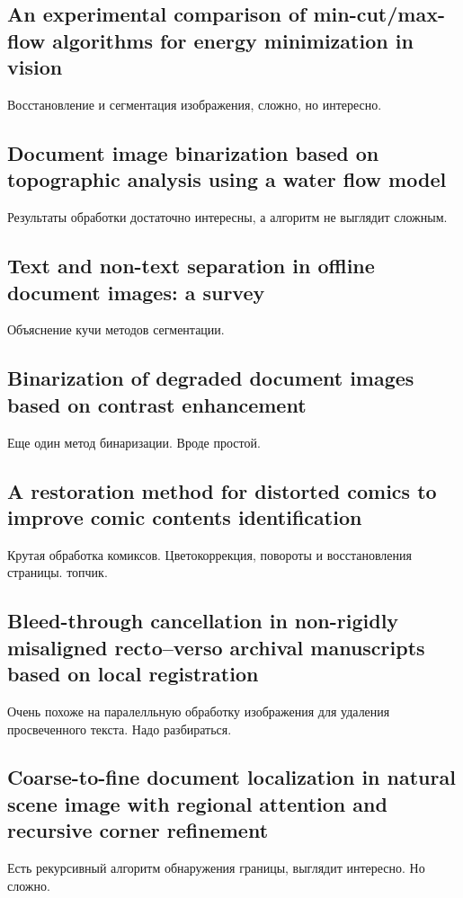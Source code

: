 \documentclass[12pt]{article}
\begin{document}
\subsection{An experimental comparison of min-cut/max- flow algorithms for energy minimization in vision}
Восстановление и сегментация изображения, сложно, но интересно.


\subsection{Document image binarization based on topographic analysis using a water flow model}
Результаты обработки достаточно интересны, а алгоритм не выглядит сложным. 


\subsection{Text and non-text separation in offline document images: a survey}
Объяснение кучи методов сегментации.


\subsection{Binarization of degraded document images based on contrast enhancement}
Еще один метод бинаризации. Вроде простой.


\subsection{A restoration method for distorted comics to improve comic contents identification}
Крутая обработка комиксов. Цветокоррекция, повороты и восстановления страницы. топчик.


\subsection{Bleed-through cancellation in non-rigidly misaligned recto–verso 
archival manuscripts based on local registration}
Очень похоже на паралелльную обработку изображения для удаления просвеченного текста. Надо разбираться.


\subsection{Coarse-to-fine document localization in natural scene 
image with regional attention and recursive corner refinement}
Есть рекурсивный алгоритм обнаружения границы, выглядит интересно. Но сложно.
\end{document}
